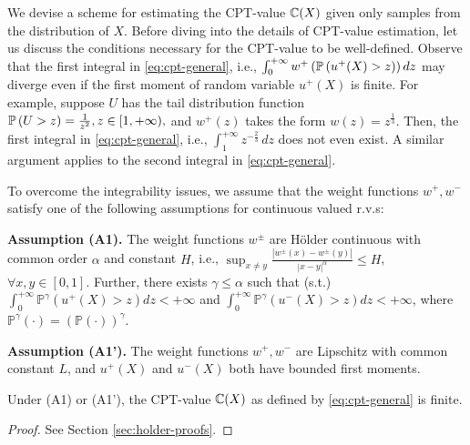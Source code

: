 
We devise a scheme for estimating the CPT-value $\mathbb{C}(X)$  given only samples from the distribution of $X$.
Before diving into the details of CPT-value estimation, let us discuss the conditions necessary for the CPT-value to be well-defined.
Observe that the first integral in \eqref{eq:cpt-general}, i.e., 
$\int_0^{+\infty} w^+\left(\mathbb{P}\left( u^+(X)>z \right)\right) d z$
may diverge even if the first moment of random variable $u^+(X)$ is finite. 
For example, suppose $U$ has the tail distribution function
$\mathbb{P}\left( U>z \right)  = \frac{1}{z^2}, z\in [1, +\infty),$
 and $w^+(z)$ takes the form $w(z) = z^{\frac{1}{3}}$. Then, the first integral in \eqref{eq:cpt-general}, i.e.,
$
\int_1^{+\infty}  z^{-\frac{2}{3}}\, dz
$
does not even exist. A similar argument applies to the second integral in \eqref{eq:cpt-general}.

To overcome the integrability issues, we assume that the weight functions $w^+, w^-$ satisfy one of the following assumptions for continuous valued r.v.s: 

\noindent\textbf{Assumption (A1).}  
The weight functions $w^{\pm}$ are H\"{o}lder continuous with common order $\alpha$ and constant $H$, i.e.,
$\sup_{x \neq y} \frac{| w^{\pm}(x) - w^{\pm}(y) |}{| x-y |^{\alpha}} \leq H$, $\forall x,y \in [0,1]$.
 Further,
there exists $ \gamma \le \alpha$ such that (s.t.)
$\int_0^{+\infty} \mathbb{P}^{\gamma} (u^+(X)>z) dz < +\infty$ and $\int_0^{+\infty} \mathbb{P}^{\gamma} (u^-(X)>z) dz < +\infty$,
where $\mathbb{P}^{\gamma}(\cdot) = \left(\mathbb{P}(\cdot)\right)^{\gamma}$.

\noindent\textbf{Assumption (A1').}  The weight functions $w^+, w^-$ are Lipschitz with common constant $L$, and 
$u^+(X)$ and $u^-(X)$ both have bounded first moments.

\begin{proposition}
\label{prop:cpt-finite}
Under (A1) or (A1'), the CPT-value $\mathbb{C}(X)$ as defined by \eqref{eq:cpt-general} is finite. 
\end{proposition}
\begin{proof}
See Section \ref{sec:holder-proofs}.
\end{proof}

